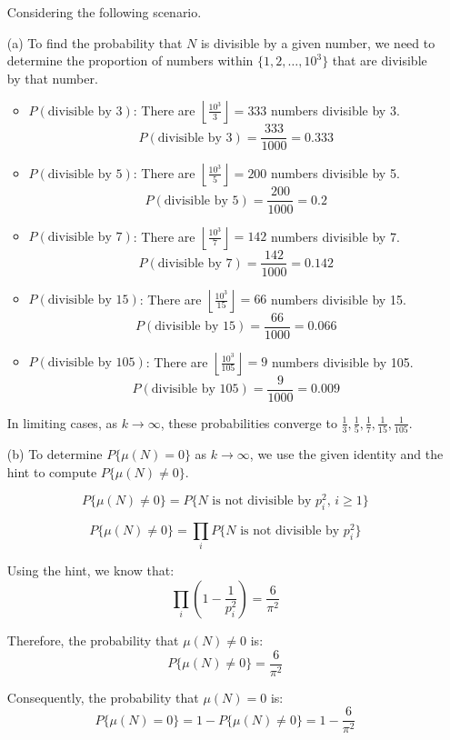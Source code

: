 \begin{solution}
\begin{enumerate}
Considering the following scenario.
    \item[(a)] To find the probability that \(N\) is divisible by a given number, we need to determine the proportion of numbers within \(\{1, 2, \ldots, 10^3\}\) that are divisible by that number.
 \begin{itemize}
        \item \(P(\text{divisible by } 3)\): There are \(\left\lfloor \frac{10^3}{3} \right\rfloor = 333\) numbers divisible by 3.
        \[
        P(\text{divisible by } 3) = \frac{333}{1000} = 0.333
        \]

        \item \(P(\text{divisible by } 5)\): There are \(\left\lfloor \frac{10^3}{5} \right\rfloor = 200\) numbers divisible by 5.
        \[
        P(\text{divisible by } 5) = \frac{200}{1000} = 0.2
        \]

        \item \(P(\text{divisible by } 7)\): There are \(\left\lfloor \frac{10^3}{7} \right\rfloor = 142\) numbers divisible by 7.
        \[
        P(\text{divisible by } 7) = \frac{142}{1000} = 0.142
        \]

        \item \(P(\text{divisible by } 15)\): There are \(\left\lfloor \frac{10^3}{15} \right\rfloor = 66\) numbers divisible by 15.
        \[
        P(\text{divisible by } 15) = \frac{66}{1000} = 0.066
        \]

        \item \(P(\text{divisible by } 105)\): There are \(\left\lfloor \frac{10^3}{105} \right\rfloor = 9\) numbers divisible by 105.
        \[
        P(\text{divisible by } 105) = \frac{9}{1000} = 0.009
        \]
    \end{itemize}

    In limiting cases, as \(k \to \infty\), these probabilities converge to \( \frac{1}{3}, \frac{1}{5}, \frac{1}{7}, \frac{1}{15}, \frac{1}{105} \).

    \item[(b)] To determine \(P\{\mu(N) = 0\}\) as \(k \to \infty\), we use the given identity and the hint to compute \(P\{\mu(N) \neq 0\}\).
    
    \[
    P\{\mu(N) \neq 0\} = P\{N \text{ is not divisible by } p_i^2, \, i \geq 1\}
    \]

    \[
    P\{\mu(N) \neq 0\} = \prod_{i} P\{N \text{ is not divisible by } p_i^2\}
    \]

    Using the hint, we know that:
    \[
    \prod_{i} \left(1 - \frac{1}{p_i^2}\right) = \frac{6}{\pi^2}
    \]

    Therefore, the probability that \(\mu(N) \neq 0\) is:
    \[
    P\{\mu(N) \neq 0\} = \frac{6}{\pi^2}
    \]

    Consequently, the probability that \(\mu(N) = 0\) is:
    \[
    P\{\mu(N) = 0\} = 1 - P\{\mu(N) \neq 0\} = 1 - \frac{6}{\pi^2}
    \]
\end{enumerate}
\end{solution}

